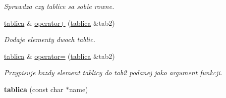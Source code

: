\begin{DoxyCompactItemize}
\begin{DoxyCompactList}\small\item\em \-Sprawdza czy tablice sa sobie rowne. \end{DoxyCompactList}\item 
\hyperlink{classtablica}{tablica} \& \hyperlink{classtablica_abc23806d17b878996403eccdfda6f1ae}{operator+} (\hyperlink{classtablica}{tablica} \&tab2)
\begin{DoxyCompactList}\small\item\em \-Dodaje elementy dwoch tablic. \end{DoxyCompactList}\item 
\hyperlink{classtablica}{tablica} \& \hyperlink{classtablica_af37b5cf937e176c153c85c7f1958ef1d}{operator=} (\hyperlink{classtablica}{tablica} \&tab2)
\begin{DoxyCompactList}\small\item\em \-Przypisuje kazdy element tablicy do tab2 podanej jako argument funkcji. \end{DoxyCompactList}\item 
\hypertarget{classtablica_a399dff7d81480b6b0d1694bda2e66de8}{{\bfseries tablica} (const char $\ast$name)}\label{classtablica_a399dff7d81480b6b0d1694bda2e66de8}

\end{DoxyCompactItemize}

